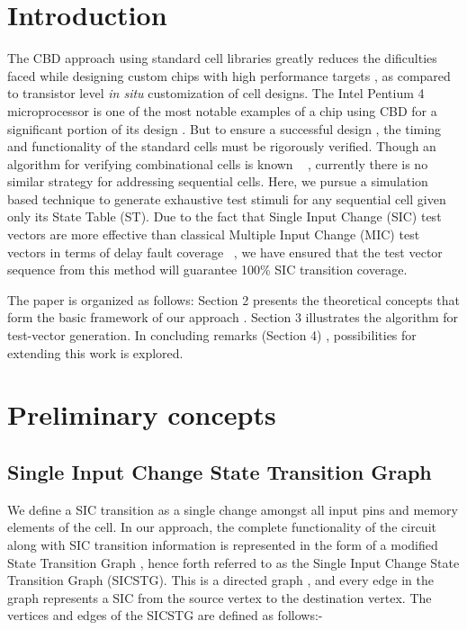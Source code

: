 \documentclass[final]{ieee}
\begin{document}
\section{Introduction}
The CBD approach using standard cell libraries greatly reduces the dificulties faced while designing custom chips with high performance targets , as compared to transistor level \textit{in situ} customization of cell designs. The Intel Pentium 4 microprocessor is one of the most notable examples of a chip using CBD for a significant portion of its design . But to ensure a successful design , the timing and functionality of the standard cells must be rigorously verified. Though an algorithm for verifying combinational cells is known ~\cite{combin} , currently there is no similar strategy for addressing sequential cells. Here, we pursue a simulation based technique to generate exhaustive test stimuli for any sequential cell given only its State Table (ST). Due to the fact that Single Input Change (SIC) test vectors are more effective than classical Multiple Input Change (MIC) test vectors in terms of delay fault coverage ~\cite{rsic}, we have ensured that the test vector sequence from this method will guarantee 100\% SIC transition coverage.

The paper is organized as follows: Section 2 presents the theoretical concepts that form the basic framework of our approach . Section 3 illustrates the algorithm for test-vector generation. In concluding remarks (Section 4) , possibilities for extending this work is explored.

\section{Preliminary concepts} 
\label{prelim}
\subsection{Single Input Change State Transition Graph}
We define a SIC transition as a single change amongst all input pins and memory elements of the cell. In our approach, the complete functionality of the circuit along with SIC transition information is represented in the form of a modified State Transition Graph , hence forth referred to as the Single Input Change State Transition Graph (SICSTG). This is a directed graph , and every edge in the graph represents a SIC from the source vertex to the destination vertex. The vertices and edges of the SICSTG are defined as follows:-
\end{document}
